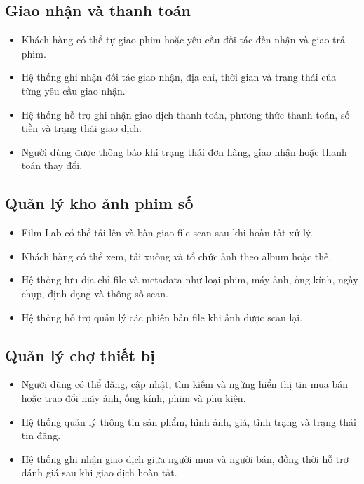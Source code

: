 \subsection{Giao nhận và thanh toán}
\begin{itemize}
    \item Khách hàng có thể tự giao phim hoặc yêu cầu đối tác đến nhận và giao trả phim.
    \item Hệ thống ghi nhận đối tác giao nhận, địa chỉ, thời gian và trạng thái của từng yêu cầu giao nhận.
    \item Hệ thống hỗ trợ ghi nhận giao dịch thanh toán, phương thức thanh toán, số tiền và trạng thái giao dịch.
    \item Người dùng được thông báo khi trạng thái đơn hàng, giao nhận hoặc thanh toán thay đổi.
\end{itemize}

\subsection{Quản lý kho ảnh phim số}
\begin{itemize}
    \item Film Lab có thể tải lên và bàn giao file scan sau khi hoàn tất xử lý.
    \item Khách hàng có thể xem, tải xuống và tổ chức ảnh theo album hoặc thẻ.
    \item Hệ thống lưu địa chỉ file và metadata như loại phim, máy ảnh, ống kính, ngày chụp, định dạng và thông số scan.
    \item Hệ thống hỗ trợ quản lý các phiên bản file khi ảnh được scan lại.
\end{itemize}

\subsection{Quản lý chợ thiết bị}
\begin{itemize}
    \item Người dùng có thể đăng, cập nhật, tìm kiếm và ngừng hiển thị tin mua bán hoặc trao đổi máy ảnh, ống kính, phim và phụ kiện.
    \item Hệ thống quản lý thông tin sản phẩm, hình ảnh, giá, tình trạng và trạng thái tin đăng.
    \item Hệ thống ghi nhận giao dịch giữa người mua và người bán, đồng thời hỗ trợ đánh giá sau khi giao dịch hoàn tất.
\end{itemize}

